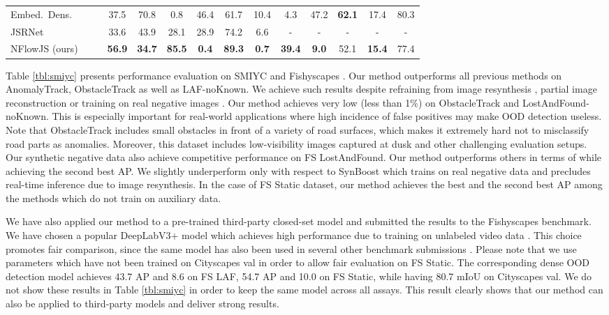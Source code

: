 \documentclass[lettersize,journal,hidelinks]{IEEEtran}
\newcommand{\xmark}{\ding{55}}
\begin{document}
\begin{table*}[ht]
\begin{footnotesize}
\begin{tabular}{l|ccccccccccccc}
Embed.\ Dens.\ \cite{blum21ijcv} & \xmark&  \xmark & 37.5 & 70.8 & 0.8 & 46.4 & 61.7 & 10.4 & 4.3 & 47.2 & \textbf{62.1} & 17.4 & 80.3\\
JSRNet \cite{vojir21iccv} & \xmark&  \xmark & 33.6& 43.9 & 28.1 & 28.9 & 74.2 & 6.6 & - & - & - & - & - \\
NFlowJS (ours) & \xmark&  \xmark & \textbf{56.9} & \textbf{34.7} & \textbf{85.5} & \textbf{0.4} & \textbf{89.3} & \textbf{0.7} &\textbf{39.4} & \textbf{9.0} & 52.1 & \textbf{15.4} & 77.4 \\ \hline
\end{tabular}
\end{footnotesize}
\end{table*}

Table \ref{tbl:smiyc} presents performance evaluation on SMIYC \cite{chan21arxiv} and Fishyscapes \cite{blum21ijcv}.
Our method outperforms all previous methods on AnomalyTrack, ObstacleTrack as well as LAF-noKnown.
We achieve such results despite refraining from image resynthesis \cite{lis19iccv,lis20arxiv,biase21cvpr}, partial image reconstruction \cite{vojir21iccv} or training on real negative images \cite{blum21ijcv}.
Our method achieves very low   (less than 1\%) on ObstacleTrack and LostAndFound-noKnown.
This is especially important for real-world applications where high incidence of false positives may make OOD detection useless.
Note that ObstacleTrack includes small obstacles in front of a variety of road surfaces, 
which makes it extremely hard not to misclassify road parts as anomalies.
Moreover, this dataset includes low-visibility images captured at dusk and other challenging evaluation setups.
Our synthetic negative data also achieve competitive performance on FS LostAndFound. 
Our method outperforms others in terms of  while achieving the second best AP.
We slightly underperform only with respect to SynBoost which trains on real negative data and precludes real-time inference due to image resynthesis.
In the case of FS Static dataset, our method achieves the best  and the second best AP among the methods which do not train on auxiliary data.


We have also applied our method to a pre-trained third-party closed-set model and submitted the results to the Fishyscapes benchmark.
We have chosen a popular DeepLabV3+ model which achieves high performance due to training on unlabeled video data \cite{zhu19cvpr}.
This choice promotes fair comparison, since the same model has also been used in several other benchmark submissions \cite{jung21iccv,vojir21iccv}.
Please note that we use parameters which have not been trained on Cityscapes val in order to allow fair evaluation on FS Static.
The corresponding dense OOD detection model achieves 
43.7 AP and 8.6  on FS LAF,  
54.7 AP and 10.0  on FS Static, while having 
80.7 mIoU on Cityscapes val. 
We do not show these results in Table \ref{tbl:smiyc} in order to keep the same model across all assays.
This result clearly shows that our method can also be applied to third-party models and deliver strong results.
\end{document}
